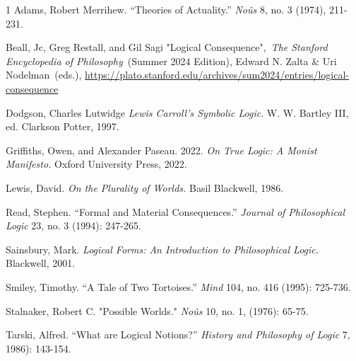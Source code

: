 
\begin{hangparas}{\hangingindent}{1}
Adams, Robert Merrihew. ``Theories of Actuality.'' \emph{Noûs} 8, no. 3
(1974), 211-231.

Beall, Jc, Greg Restall, and Gil Sagi "Logical Consequence",~\emph{The
Stanford Encyclopedia of Philosophy~}(Summer 2024 Edition), Edward N.
Zalta \& Uri Nodelman~(eds.),
\newline
\url{https://plato.stanford.edu/archives/sum2024/entries/logical-consequence}

Dodgson, Charles Lutwidge \emph{Lewis Carroll's Symbolic Logic}. W. W.
Bartley III, ed. Clarkson Potter, 1997.

Griffiths, Owen, and Alexander Paseau. 2022. \emph{On True Logic: A
Monist Manifesto.} Oxford University Press, 2022.

Lewis, David. \emph{On the Plurality of Worlds.} Basil Blackwell, 1986.

Read, Stephen. ``Formal and Material Consequences.'' \emph{Journal of Philosophical Logic} 23,
no. 3 (1994): 247-265.

Sainsbury, Mark. \emph{Logical Forms: An
Introduction to Philosophical Logic.} Blackwell, 2001.

Smiley, Timothy. ``A Tale of Two Tortoises.'' \emph{Mind} 104, no. 416 (1995):
725-736.

Stalnaker, Robert C. "Possible Worlds." \emph{Noûs} 10, no. 1, (1976): 65-75.

Tarski, Alfred. ``What are Logical Notions?''
\emph{History and Philosophy of Logic} 7, 1986): 143-154.
\end{hangparas}
